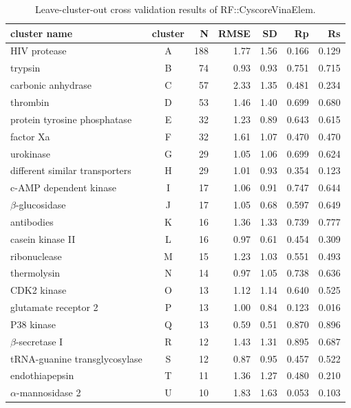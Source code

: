 \begin{table}
\caption{Leave-cluster-out cross validation results of RF::CyscoreVinaElem.}
\label{rfcyscore:lcocv4}
\begin{tabular}{lcrrrrr}
\hline
cluster name & cluster & N & RMSE & SD & Rp & Rs\\
\hline
HIV protease                   & A & 188 & 1.77 & 1.56 & 0.166 & 0.129\\
trypsin                        & B &  74 & 0.93 & 0.93 & 0.751 & 0.715\\
carbonic anhydrase             & C &  57 & 2.33 & 1.35 & 0.481 & 0.234\\
thrombin                       & D &  53 & 1.46 & 1.40 & 0.699 & 0.680\\
protein tyrosine phosphatase   & E &  32 & 1.23 & 0.89 & 0.643 & 0.615\\
factor Xa                      & F &  32 & 1.61 & 1.07 & 0.470 & 0.470\\
urokinase                      & G &  29 & 1.05 & 1.06 & 0.699 & 0.624\\
different similar transporters & H &  29 & 1.01 & 0.93 & 0.354 & 0.123\\
c-AMP dependent kinase         & I &  17 & 1.06 & 0.91 & 0.747 & 0.644\\
$\beta$-glucosidase            & J &  17 & 1.05 & 0.68 & 0.597 & 0.649\\
antibodies                     & K &  16 & 1.36 & 1.33 & 0.739 & 0.777\\
casein kinase II               & L &  16 & 0.97 & 0.61 & 0.454 & 0.309\\
ribonuclease                   & M &  15 & 1.23 & 1.03 & 0.551 & 0.493\\
thermolysin                    & N &  14 & 0.97 & 1.05 & 0.738 & 0.636\\
CDK2 kinase                    & O &  13 & 1.12 & 1.14 & 0.640 & 0.525\\
glutamate receptor 2           & P &  13 & 1.00 & 0.84 & 0.123 & 0.016\\
P38 kinase                     & Q &  13 & 0.59 & 0.51 & 0.870 & 0.896\\
$\beta$-secretase I            & R &  12 & 1.43 & 1.31 & 0.895 & 0.687\\
tRNA-guanine transglycosylase  & S &  12 & 0.87 & 0.95 & 0.457 & 0.522\\
endothiapepsin                 & T &  11 & 1.36 & 1.27 & 0.480 & 0.210\\
$\alpha$-mannosidase 2         & U &  10 & 1.83 & 1.63 & 0.053 & 0.103\\

\end{tabular}
\end{table}
